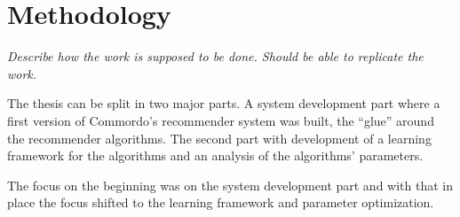 \chapter{Methodology}\label{cha:method}

\textit{Describe how the work is supposed to be done. Should be able to replicate the work.}

The thesis can be split in two major parts. A system development part where a first version of Commordo's recommender system was built, the ``glue'' around the recommender algorithms. The second part with development of a learning framework for the algorithms and an analysis of the algorithms' parameters.

The focus on the beginning was on the system development part and with that in place the focus shifted to the learning framework and parameter optimization.





